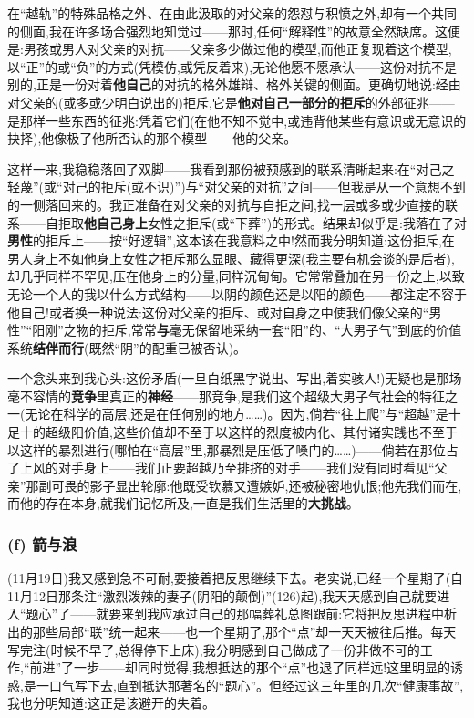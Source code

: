 在“越轨”的特殊品格之外、在由此汲取的对父亲的怨怼与积愤之外,却有一个共同的侧面,我在许多场合强烈地知觉过——那时,任何“解释性”的故意全然缺席。这便是:男孩或男人对父亲的对抗——父亲多少做过他的模型,而他正复现着这个模型,以“正”的或“负”的方式(凭模仿,或凭反着来),无论他愿不愿承认——这份对抗不是别的,正是一份对着\textbf{他自己}的对抗的格外雄辩、格外关键的侧面。更确切地说:经由对父亲的(或多或少明白说出的)拒斥,它是\textbf{他对自己一部分的拒斥}的外部征兆——是那样一些东西的征兆:凭着它们(在他不知不觉中,或违背他某些有意识或无意识的抉择),他像极了他所否认的那个模型——他的父亲。

这样一来,我稳稳落回了双脚——我看到那份被预感到的联系清晰起来:在“对己之轻蔑”(或“对己的拒斥(或不识)”)与“对父亲的对抗”之间——但我是从一个意想不到的一侧落回来的。我正准备在对父亲的对抗与自拒之间,找一层或多或少直接的联系——自拒取\textbf{他自己身上}女性之拒斥(或“下葬”)的形式。结果却似乎是:我落在了对\textbf{男性}的拒斥上——按“好逻辑”,这本该在我意料之中!然而我分明知道:这份拒斥,在男人身上不如他身上女性之拒斥那么显眼、藏得更深(我主要有机会谈的是后者),却几乎同样不罕见,压在他身上的分量,同样沉甸甸。它常常叠加在另一份之上,以致无论一个人的我以什么方式结构——以阴的颜色还是以阳的颜色——都注定不容于他自己!或者换一种说法:这份对父亲的拒斥、或对自身之中使我们像父亲的“男性”“阳刚”之物的拒斥,常常\textbf{与}毫无保留地采纳一套“阳”的、“大男子气”到底的价值系统\textbf{结伴而行}(既然“阴”的配重已被否认)。

一个念头来到我心头:这份矛盾(一旦白纸黑字说出、写出,着实骇人!)无疑也是那场毫不容情的\textbf{竞争}里真正的\textbf{神经}——那竞争,是我们这个超级大男子气社会的特征之一(无论在科学的高层,还是在任何别的地方……)。因为,倘若“往上爬”与“超越”是十足十的超级阳价值,这些价值却不至于以这样的烈度被内化、其付诸实践也不至于以这样的暴烈进行(哪怕在“高层”里,那暴烈是压低了嗓门的……)——倘若在那位占了上风的对手身上——我们正要超越乃至排挤的对手——我们没有同时看见“父亲”那副可畏的影子显出轮廓:他既受钦慕又遭嫉妒,还被秘密地仇恨;他先我们而在,而他的存在本身,就我们记忆所及,一直是我们生活里的\textbf{大挑战}。

\subsubsection*{(f) 箭与浪}
\label{ch18:local:h40}

\label{ch18:local:n36}

(11月19日)我又感到急不可耐,要接着把反思继续下去。老实说,已经一个星期了(自11月12日那条注“激烈泼辣的妻子(阴阳的颠倒)”(126)起),我天天感到自己就要进入“题心”了——就要来到我应承过自己的那幅葬礼总图跟前:它将把反思进程中析出的那些局部“联”统一起来\dmark{}——也一个星期了,那个“点”却一天天被往后推。每天写完注(时候不早了,总得停下上床),我分明感到自己做成了一份非做不可的工作,“前进”了一步——却同时觉得,我想抵达的那个“点”也退了同样远!这里明显的诱惑,是一口气写下去,直到抵达那著名的“题心”。但经过这三年里的几次“健康事故”,我也分明知道:这正是该避开的失着。

